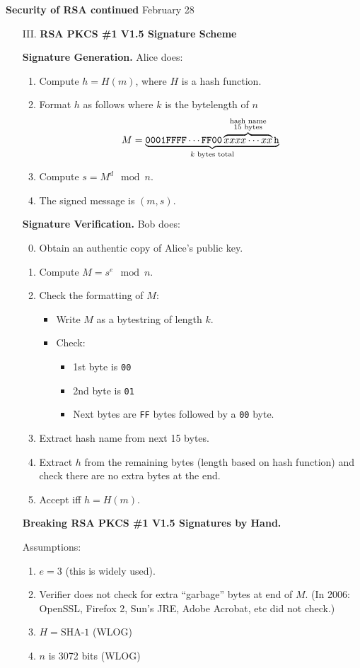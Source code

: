 \documentclass[a4paper,12pt]{article}
\begin{document}
\clearpage
{\bf Security of RSA continued} \hfill February 28
\begin{enumerate}
\item[III.]
{\bf RSA PKCS \#1 V1.5 Signature Scheme}

{\bf Signature Generation.}
Alice does:
\begin{enumerate}
\item Compute $h = H(m)$, where $H$ is a hash function.
\item Format $h$ as follows where $k$ is the bytelength of $n$
\[
M = \underbrace{{\tt 0001FFFF\cdots FF00\overbrace{xxxx\cdots xx}^{\substack{\text{hash name}\\15\text{ bytes}}}h}}_{k\text{ bytes total}}
\]
\item Compute $s = M^d \mod n$.
\item The signed message is $(m,s)$.
\end{enumerate}

{\bf Signature Verification.}
Bob does:
\begin{enumerate}
\setcounter{enumi}{-1}
\item Obtain an authentic copy of Alice's public key.
\item Compute $M = s^e \mod n$.
\item Check the formatting of $M$:
\begin{itemize}
\item Write $M$ as a bytestring of length $k$.
\item Check:
\begin{itemize}
\item 1st byte is {\tt00}
\item 2nd byte is {\tt01}
\item Next bytes are {\tt FF} bytes followed by a {\tt00} byte.
\end{itemize}
\end{itemize}
\item Extract hash name from next 15 bytes.
\item Extract $h$ from the remaining bytes (length based on hash function) and check there are no extra bytes at the end.
\item Accept iff $h = H(m)$.
\end{enumerate}

{\bf Breaking RSA PKCS \#1 V1.5 Signatures by Hand.}

Assumptions:
\begin{enumerate}
\item $e=3$ (this is widely used).
\item Verifier does not check for extra ``garbage'' bytes at end of $M$. (In 2006: OpenSSL, Firefox 2, Sun's JRE, Adobe Acrobat, etc did not check.)
\item $H = \text{SHA-1}$ (WLOG)
\item $n$ is 3072 bits (WLOG)
\end{enumerate}


\end{enumerate}
\end{document}
